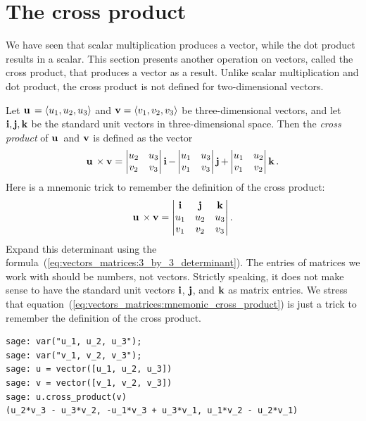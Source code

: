 
\section{The cross product}

We have seen that scalar multiplication produces a vector, while the
dot product results in a scalar. This section presents another
operation on vectors, called the cross product, that produces
a vector as a result. Unlike scalar multiplication and dot product,
the cross product is not defined for two-dimensional vectors.

Let $\operatorname*{\mathbf{u}}{} = \langle u_1, u_2, u_3 \rangle$ and
$\operatorname*{\mathbf{v}} = \langle v_1, v_2, v_3 \rangle$ be three-dimensional vectors,
and let $\operatorname*{\mathbf{i}}, \operatorname*{\mathbf{j}}, \operatorname*{\mathbf{k}}$ be the standard unit vectors in
three-dimensional space. Then the \emph{cross product} of $\operatorname*{\mathbf{u}}{}$ and
$\operatorname*{\mathbf{v}}$ is defined as the vector
\[
\operatorname*{\mathbf{u}}{} \times \operatorname*{\mathbf{v}}
=
\begin{vmatrix}
u_2 & u_3 \\
v_2 & v_3
\end{vmatrix}
\operatorname*{\mathbf{i}}
-
\begin{vmatrix}
u_1 & u_3 \\
v_1 & v_3
\end{vmatrix}
\operatorname*{\mathbf{j}}
+
\begin{vmatrix}
u_1 & u_2 \\
v_1 & v_2
\end{vmatrix}
\operatorname*{\mathbf{k}}.
\]
Here is a mnemonic trick to remember the definition of the cross
product:
%
\begin{equation}
\label{eq:vectors_matrices:mnemonic_cross_product}
\operatorname*{\mathbf{u}}{} \times \operatorname*{\mathbf{v}}
=
\begin{vmatrix}
\operatorname*{\mathbf{i}} & \operatorname*{\mathbf{j}} & \operatorname*{\mathbf{k}} \\
u_1 & u_2 & u_3 \\
v_1 & v_2 & v_3
\end{vmatrix}.
\end{equation}
%
Expand this determinant using the
formula~(\ref{eq:vectors_matrices:3_by_3_determinant}). The entries of
matrices we work with should be numbers, not vectors. Strictly
speaking, it does not make sense to have the standard unit vectors
$\operatorname*{\mathbf{i}}$, $\operatorname*{\mathbf{j}}$, and $\operatorname*{\mathbf{k}}$ as matrix entries. We stress that
equation~(\ref{eq:vectors_matrices:mnemonic_cross_product}) is just a
trick to remember the definition of the cross product.

\begin{lstlisting}
sage: var("u_1, u_2, u_3");
sage: var("v_1, v_2, v_3");
sage: u = vector([u_1, u_2, u_3])
sage: v = vector([v_1, v_2, v_3])
sage: u.cross_product(v)
(u_2*v_3 - u_3*v_2, -u_1*v_3 + u_3*v_1, u_1*v_2 - u_2*v_1)
\end{lstlisting}

